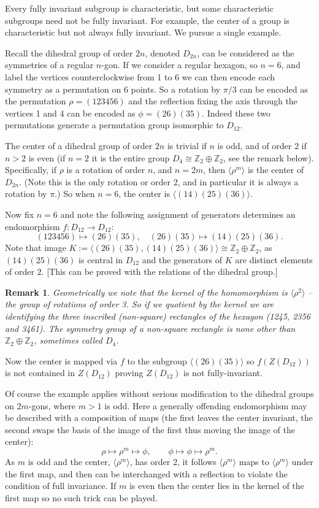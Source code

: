 \documentclass[12pt]{article}
\newtheorem{remark}[thm]{Remark}
\begin{document}
Every fully invariant subgroup is characteristic, but some characteristic subgroups need not be fully invariant.  For example, the center of a group is characteristic but not always fully invariant.  We pursue a single example.

Recall the dihedral group of order $2n$, denoted $D_{2n}$, can be considered as the symmetries of a regular $n$-gon.  If we consider a regular hexagon, so $n=6$, and label the vertices counterclockwise from 1 to 6 we can then encode each symmetry as a permutation on 6 points.  So a rotation by $\pi/3$ can be encoded as the permutation $\rho = (123456)$ and the reflection fixing the axis through the vertices 1 and 4 can be encoded as $\phi = (26)(35)$.  Indeed these two permutations generate a permutation group isomorphic to $D_{12}$.

The center of a dihedral group of order $2n$ is trivial if $n$ is odd, and of order 2 if $n>2$ is even (if $n=2$ it is the entire group $D_4\cong \mathbb{Z}_2\oplus\mathbb{Z}_2$, see the remark below).  Specifically, if $\rho$ is a rotation of order $n$, and $n=2m$, then $\langle \rho^m\rangle$ is the center of $D_{2n}$.  (Note this is the only rotation or order 2, and in particular it is always a rotation by $\pi$.)
So when $n=6$, the center is $\langle (14)(25)(36)\rangle$.

Now fix $n=6$ and note the following assignment of generators determines an endomorphism $f:D_{12}\rightarrow D_{12}$:
\[(123456)\mapsto (26)(35),\quad (26)(35)\mapsto (14)(25)(36).\]
Note that image $K:=\langle (26)(35),(14)(25)(36)\rangle\cong \mathbb{Z}_2\oplus \mathbb{Z}_2$, as $(14)(25)(36)$ is central in $D_{12}$ and the generators of
$K$ are distinct elements of order $2$.  [This can be proved with the relations of the dihedral group.]

\begin{remark}
Geometrically we note that the kernel of the homomorphism is $\langle \rho^2\rangle$ -- the group of rotations of order 3.  So if we quotient by the kernel we are identifying the three inscribed (non-square) rectangles of the hexagon (1245, 2356 and 3461).  The symmetry group of a non-square rectangle is none other than $\mathbb{Z}_2\oplus\mathbb{Z}_2$, sometimes called $D_{4}$.
\end{remark}

Now the center is mapped via $f$ to the subgroup $\langle (26)(35)\rangle$ so 
$f(Z(D_{12}))$ is not contained in $Z(D_{12})$ proving $Z(D_{12})$ is not fully-invariant.

Of course the example applies without serious modification to the dihedral groups on $2m$-gons, where $m>1$ is odd.  Here a generally offending endomorphism may be described with a composition of maps (the first leaves the center invariant, the second swaps the basis of the image of the first thus moving the image of the center):
\[\rho\mapsto \rho^m\mapsto \phi,\qquad \phi\mapsto \phi\mapsto \rho^m.\]
As $m$ is odd and the center, $\langle \rho^m\rangle$, has order 2, it follows $\langle\rho^m\rangle$ maps to $\langle \rho^m\rangle$ under the first map, and then can be interchanged with a reflection to violate the condition of full invariance.  If $m$ is even then the center lies in the kernel of the first map so no such trick can be played.
\end{document}
